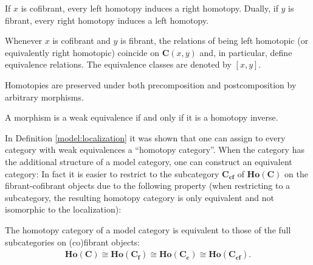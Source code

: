     \begin{property}
        If $x$ is cofibrant, every left homotopy induces a right homotopy. Dually, if $y$ is fibrant, every right homotopy induces a left homotopy.
    \end{property}
    \begin{result}
        Whenever $x$ is cofibrant and $y$ is fibrant, the relations of being left homotopic (or equivalently right homotopic) coincide on $\mathbf{C}(x,y)$ and, in particular, define equivalence relations. The equivalence classes are denoted by $[x,y]$.
    \end{result}

    \begin{property}
        Homotopies are preserved under both precomposition and postcomposition by arbitrary morphisms.
    \end{property}
    \begin{property}
        A morphism is a weak equivalence if and only if it is a homotopy inverse.
    \end{property}


    In Definition \ref{model:localization} it was shown that one can assign to every category with weak equivalences a ``homotopy category''. When the category has the additional structure of a model category, one can construct an equivalent category:
    In fact it is easier to restrict to the subcategory $\mathbf{C_{cf}}$ of $\mathbf{Ho(C)}$ on the fibrant-cofibrant objects due to the following property (when restricting to a subcategory, the resulting homotopy category is only equivalent and not isomorphic to the localization):
    \begin{property}
        The homotopy category of a model category is equivalent to those of the full subcategories on (co)fibrant objects:
        \begin{gather}
            \mathbf{Ho(C)}\cong\mathbf{Ho(C_f)}\cong\mathbf{Ho(C_c)}\cong\mathbf{Ho(C_{cf})}.
        \end{gather}
    \end{property}

